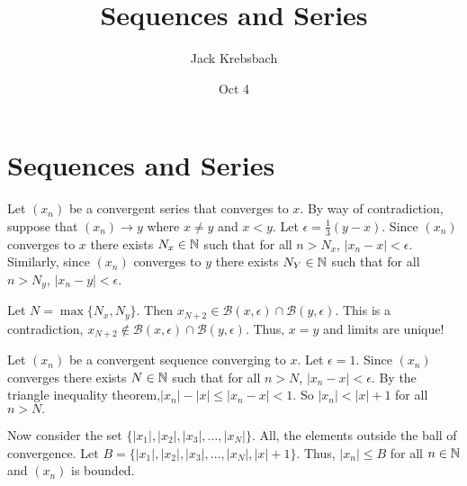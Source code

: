 \documentclass{report}
\title{Sequences and Series}
\author{Jack Krebsbach }
\date{Oct 4}
\begin{document}
\maketitle

\section{Sequences and Series}




\begin{myproof}
  Let $(x_n)$ be a convergent series that converges to $x.$ By way of contradiction, suppose that $(x_n) \rightarrow y$ where $x \neq y$ and $x < y$. Let $\epsilon = \frac{1}{3}(y-x).$  Since $(x_n)$ converges to $x$ there exists $N_x \in \NN$ such that for all $n> N_x$, $|x_n - x| < \epsilon.$ Similarly, since $(x_n)$ converges to $y$ there exists $N_Y \in \NN$ such that for all $n> N_y$, $|x_n - y| <\epsilon.$ 

  \par Let $N = \max\{N_x, N_y\}.$  Then $x_{N+2} \in \mathcal{B}(x,\epsilon) \cap \mathcal{B}(y,\epsilon)$. This is a contradiction, $x_{N+2} \not\in \mathcal{B}(x,\epsilon) \cap \mathcal{B}(y,\epsilon).$ Thus,  $x=y$ and limits are unique!
\end{myproof}



\begin{myproof}
Let $(x_n)$ be a convergent sequence converging to $x$. Let $\epsilon =1.$ Since $(x_n)$ converges there exists $N \in \NN$ such that for all $n> N$, $|x_n - x| <\epsilon.$ By the triangle inequality theorem,$|x_n| - |x| \leq |x_n -x| < 1.$ So $|x_n|< |x| +1$ for all $n >N.$
\par 
Now consider the set $\{|x_1|, |x_2|, |x_3|,\dots, |x_N|\}.$ All, the elements outside the ball of convergence.  Let $B= \{|x_1|, |x_2|, |x_3|,\dots, |x_N|, |x| + 1\}.$ Thus, $|x_n| \leq B$ for all $n \in \NN$ and $(x_n)$ is bounded.
    
\end{myproof}
\end{document}
